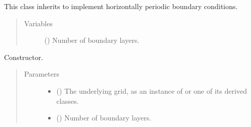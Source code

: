 \documentclass[letterpaper,10pt,english]{sphinxmanual}
\begin{document}
\begin{fulllineitems}
\label{\detokenize{api:dycore.horizontal_boundary.Periodic}}
This class inherits {\hyperref[\detokenize{api:dycore.horizontal_boundary.HorizontalBoundary}]{}} to implement horizontally periodic boundary conditions.
\begin{quote}\begin{description}
\item[{Variables}] \leavevmode
{\hyperref[\detokenize{api:dycore.prognostic_isentropic.PrognosticIsentropic.nb}]{}} () \textendash{} Number of boundary layers.

\end{description}\end{quote}

\begin{fulllineitems}
\label{\detokenize{api:dycore.horizontal_boundary.Periodic.__init__}}
Constructor.
\begin{quote}\begin{description}
\item[{Parameters}] \leavevmode\begin{itemize}
\item {} 
 () \textendash{} The underlying grid, as an instance of {\hyperref[\detokenize{api:grids.grid_xyz.GridXYZ}]{}} or one of its derived classes.

\item {} 
 () \textendash{} Number of boundary layers.

\end{itemize}

\end{description}\end{quote}

\end{fulllineitems}



\end{fulllineitems}
\end{document}
